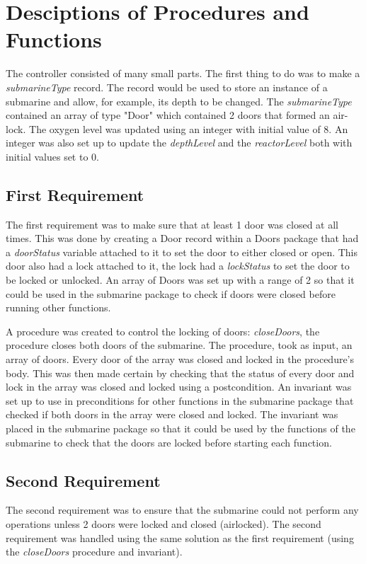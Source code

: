 \section{Desciptions of Procedures and Functions}
The controller consisted of many small parts. The first thing to do was to make a \textit{submarineType} record. The record would be used to store an instance of a submarine and allow, for example, its depth to be changed. The \textit{submarineType} contained an array of type "Door" which contained 2 doors that formed an air-lock. The oxygen level was updated using an integer with initial value of 8. An integer was also set up to update the \textit{depthLevel} and the \textit{reactorLevel} both with initial values set to 0.

\subsection{First Requirement}
The first requirement was to make sure that at least 1 door was closed at all times. This was done by creating a Door record within a Doors package that had a \textit{doorStatus} variable attached to it to set the door to either closed or open. This door also had a lock attached to it, the lock had a \textit{lockStatus} to set the door to be locked or unlocked. An array of Doors was set up with a range of 2 so that it could be used in the submarine package to check if doors were closed before running other functions.

 A procedure was created to control the locking of doors: \textit{closeDoors}, the procedure closes both doors of the submarine. The procedure, took as input, an array of doors. Every door of the array was closed and locked in the procedure's body. This was then made certain by checking that the status of every door and lock in the array was closed and locked using a postcondition. An invariant was set up to use in preconditions for other functions in the submarine package that checked if both doors in the array were closed and locked. The invariant was placed in the submarine package so that it could be used by the functions of the submarine to check that the doors are locked before starting each function.

\subsection{Second Requirement}
The second requirement was to ensure that the submarine could not perform any operations unless 2 doors were locked and closed (airlocked). The second requirement was handled using the same solution as the first requirement (using the \textit{closeDoors} procedure and invariant).

